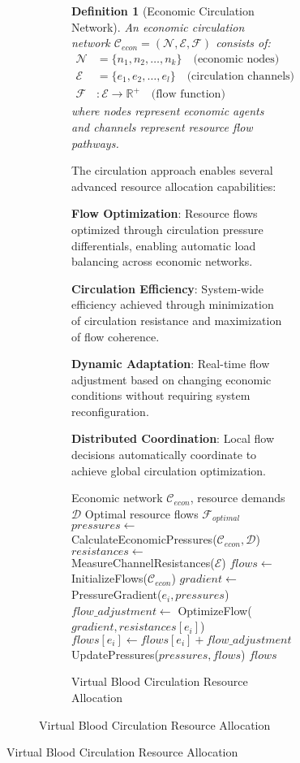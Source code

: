 \documentclass[12pt,a4paper]{article}
\newtheorem{definition}[theorem]{Definition}
\begin{document}
\begin{figure}[H]
\begin{figure}[H]
\begin{figure}[H]
\begin{definition}[Economic Circulation Network]
An economic circulation network $\mathcal{C}_{econ} = (\mathcal{N}, \mathcal{E}, \mathcal{F})$ consists of:
\begin{align}
\mathcal{N} &= \{n_1, n_2, \ldots, n_k\} \quad \text{(economic nodes)} \\
\mathcal{E} &= \{e_1, e_2, \ldots, e_l\} \quad \text{(circulation channels)} \\
\mathcal{F} &: \mathcal{E} \rightarrow \mathbb{R}^+ \quad \text{(flow function)}
\end{align}
where nodes represent economic agents and channels represent resource flow pathways.
\end{definition}

The circulation approach enables several advanced resource allocation capabilities:

\textbf{Flow Optimization}: Resource flows optimized through circulation pressure differentials, enabling automatic load balancing across economic networks.

\textbf{Circulation Efficiency}: System-wide efficiency achieved through minimization of circulation resistance and maximization of flow coherence.

\textbf{Dynamic Adaptation}: Real-time flow adjustment based on changing economic conditions without requiring system reconfiguration.

\textbf{Distributed Coordination}: Local flow decisions automatically coordinate to achieve global circulation optimization.

\begin{algorithm}
\caption{Virtual Blood Circulation Resource Allocation}
\begin{algorithmic}[1]
\Require Economic network $\mathcal{C}_{econ}$, resource demands $\mathcal{D}$
\Ensure Optimal resource flows $\mathcal{F}_{optimal}$
\State $pressures \leftarrow$ CalculateEconomicPressures($\mathcal{C}_{econ}, \mathcal{D}$)
\State $resistances \leftarrow$ MeasureChannelResistances($\mathcal{E}$)
\State $flows \leftarrow$ InitializeFlows($\mathcal{C}_{econ}$)
        \State $gradient \leftarrow$ PressureGradient($e_i, pressures$)
        \State $flow\_adjustment \leftarrow$ OptimizeFlow($gradient, resistances[e_i]$)
        \State $flows[e_i] \leftarrow flows[e_i] + flow\_adjustment$
    \EndFor
    \State UpdatePressures($pressures, flows$)
\EndWhile
\Return $flows$
\end{algorithmic}
\end{algorithm}


\end{figure}
\end{figure}
\end{figure}
\end{document}
